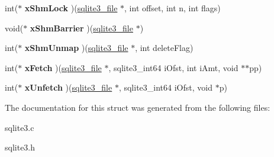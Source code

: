 \begin{DoxyCompactItemize}
\item 
int($\ast$ {\bfseries x\+Shm\+Lock} )(\hyperlink{structsqlite3__file}{sqlite3\+\_\+file} $\ast$, int offset, int n, int flags)\hypertarget{structsqlite3__io__methods_a58f4a6b0df86440029cc5fa1b65b1b4e}{}\label{structsqlite3__io__methods_a58f4a6b0df86440029cc5fa1b65b1b4e}

\item 
void($\ast$ {\bfseries x\+Shm\+Barrier} )(\hyperlink{structsqlite3__file}{sqlite3\+\_\+file} $\ast$)\hypertarget{structsqlite3__io__methods_aedf4a59fa25ad33e0625a2aa0f6f2184}{}\label{structsqlite3__io__methods_aedf4a59fa25ad33e0625a2aa0f6f2184}

\item 
int($\ast$ {\bfseries x\+Shm\+Unmap} )(\hyperlink{structsqlite3__file}{sqlite3\+\_\+file} $\ast$, int delete\+Flag)\hypertarget{structsqlite3__io__methods_af69cbc7ece1854576ac262f986871563}{}\label{structsqlite3__io__methods_af69cbc7ece1854576ac262f986871563}

\item 
int($\ast$ {\bfseries x\+Fetch} )(\hyperlink{structsqlite3__file}{sqlite3\+\_\+file} $\ast$, sqlite3\+\_\+int64 i\+Ofst, int i\+Amt, void $\ast$$\ast$pp)\hypertarget{structsqlite3__io__methods_ad817335f15cad777b60d973f73cb542c}{}\label{structsqlite3__io__methods_ad817335f15cad777b60d973f73cb542c}

\item 
int($\ast$ {\bfseries x\+Unfetch} )(\hyperlink{structsqlite3__file}{sqlite3\+\_\+file} $\ast$, sqlite3\+\_\+int64 i\+Ofst, void $\ast$p)\hypertarget{structsqlite3__io__methods_a81c025bf5851547d47ceef8e83214692}{}\label{structsqlite3__io__methods_a81c025bf5851547d47ceef8e83214692}

\end{DoxyCompactItemize}


The documentation for this struct was generated from the following files\+:\begin{DoxyCompactItemize}
\item 
sqlite3.\+c\item 
sqlite3.\+h\end{DoxyCompactItemize}
